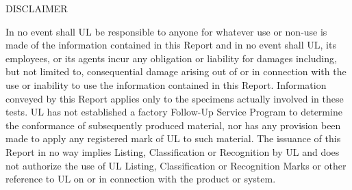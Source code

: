 \documentclass{article}
\begin{document}
\begin{center}
	DISCLAIMER\\
	\vspace*{\baselineskip}
	\begin{adjustwidth}{-0.25in}{-0.25in}
		In no event shall UL be responsible to anyone for whatever use or non-use is made of the information contained in this Report and in no event shall UL, its employees, or its agents incur any obligation or liability for damages including, but not limited to, consequential damage arising out of or in connection  with the use or inability to use the information contained in this Report. Information conveyed by this Report applies only to the specimens actually involved in these tests. UL has not established a factory Follow-Up Service Program to determine the conformance of subsequently produced material, nor has any provision been made to apply any registered mark of UL to such material. The issuance of this Report in no way implies Listing, Classification or Recognition by UL and does not authorize the use of UL Listing, Classification or Recognition Marks or other reference to UL on or in connection with the product or system.
	\end{adjustwidth}
\end{center}
\end{document}
